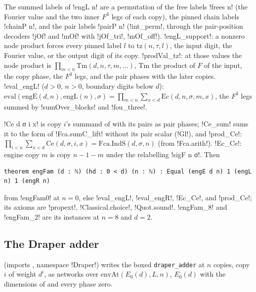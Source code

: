 {\begin{theorem}\label{thm:boxes-fca-eng-L}
The summed labels of \lbx!engL n! are a permutation of the free labels \lbx!frees n! (the Fourier value and the two inner $F^3$ legs of each copy), the pinned chain labels \lbx!chainP n!, and the pair labels \lbx!pairP n! (\lbx!int_perm!, through the pair-position decoders \lbx!jOf! and \lbx!mOf! with \lbx!jOf_tri!, \lbx!mOf_off!). \lbx!engL_support!: a nonzero node product forces every pinned label $l$ to $\mathrm{tz}(n,\tau,l)$, the input digit, the Fourier value, or the output digit of its copy. \lbx!prodVal_tz!: at those values the node product is $\prod_{m<n}\mathrm{Tm}(d,n,\tau,m,\ldots)$, $\mathrm{Tm}$ the product of $F$ of the input, the copy phase, the $F^3$ legs, and the pair phases with the later copies. \lbx!eval_engL! ($d>0$, $n>0$, boundary digits below $d$): $\mathrm{eval}(\mathrm{engE}(d,n),\mathrm{engL}(n),\sigma)=\prod_{m<n}\sum_{x<d}\mathrm{Ec}(d,n,\sigma,m,x)$, the $F^3$ legs summed by \lbx!sumOver_blocks! and \lbx!fou_three!.
\end{theorem}

\begin{theorem}\label{thm:boxes-fca-eng-fam}
\lbx!Ce d σ i x! is copy $i$'s summand of  with its pairs as pair phases; \lbx!Ce_sum! sums it to the form of \lbx!Fca.sumC_lift! without its pair scalar (\lbx!Gl!), and \lbx!prod_Ce!: $\prod_{i<n}\sum_{x<d}\mathrm{Ce}(d,\sigma,i,x)=\mathrm{Fca.IndS}(d,\sigma,n)$ (from \lbx!Fca.arith!). \lbx!Ec_Ce!: engine copy $m$ is  copy $n-1-m$ under the relabelling \lbx!sigF n σ!. Then
\begin{lstlisting}[style=leanbox]
theorem engFam (d : ℕ) (hd : 0 < d) (n : ℕ) : Equal (engE d n) 1 (engL n) 1 (engR n)
\end{lstlisting}
from \lbx!engFam0! at $n=0$, else \lbx!eval_engL!, \lbx!eval_engR!, \lbx!Ec_Ce!, and \lbx!prod_Ce!; its axioms are \lbx!propext!, \lbx!Classical.choice!, \lbx!Quot.sound!. \lbx!engFam_8! and \lbx!engFam_2! are its instances at $n=8$ and $d=2$.
\end{theorem}

\subsection{The Draper adder}\label{sec:boxes-draper}

 (imports , namespace \lbx!Draper!) writes the boxed \texttt{draper\_adder} at $n$ copies, copy $i$ of weight $d^i$, as networks over $\mathrm{envAt}(E_0(d),L,n)$, $E_0(d)$ with the dimensions of  and every phase zero.

}
